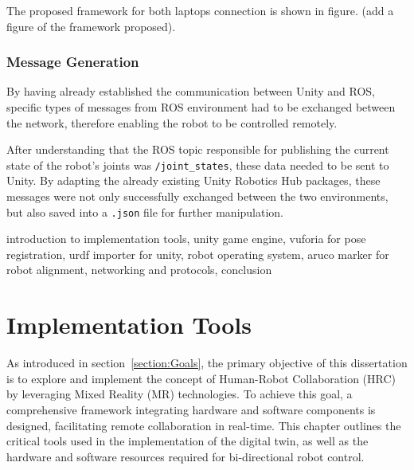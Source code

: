 The proposed framework for both laptops connection is shown in figure. (add a figure of the framework proposed).




\subsection{Message Generation}

By having already established the communication between Unity and ROS, specific types of messages from ROS environment had to be exchanged between the network, therefore enabling the robot to be controlled remotely.

After understanding that the ROS topic responsible for publishing the current state of the robot's joints was \texttt{/joint\_states}, these data needed to be sent to Unity. By adapting the already existing Unity Robotics Hub packages, these messages were not only successfully exchanged between the two environments, but also saved into a \texttt{.json} file for further manipulation.








introduction to implementation tools, unity game engine, vuforia for pose registration, urdf importer for unity, robot operating system, aruco marker for robot alignment, networking and protocols, conclusion

\chapter{Implementation Tools}%
\label{chapter:tools}

As introduced in section~\ref{section:Goals}, the primary objective of this dissertation is to explore and implement the concept of Human-Robot Collaboration (\ac{HRC}) by leveraging Mixed Reality (\ac{MR}) technologies. To achieve this goal, a comprehensive framework integrating hardware and software components is designed, facilitating remote collaboration in real-time. This chapter outlines the critical tools used in the implementation of the digital twin, as well as the hardware and software resources required for bi-directional robot control.

